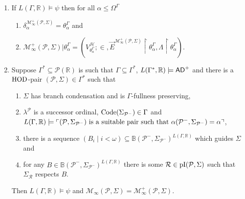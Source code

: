 \documentclass[../main]{subfiles}
\begin{document}
{\begin{enumerate}
  \item If $L(\Gamma, \mathbb{R}) \models \psi$  then for all $\alpha \le \Omega^{\Gamma}$
    \begin{enumerate}
    \item $\delta_{\alpha}^{\mathcal{M}^{+}_{\infty}(\mathcal{P}, \Sigma)}
      = \theta^{\Gamma}_{\alpha}$ and
    \item
      $\mathcal{M}^{+}_{\infty}(\mathcal{P}, \Sigma) |
      \theta^{\Gamma}_{\alpha} =
      (V^{\mathcal{H}}_{\theta^{\Gamma}_{\alpha}};\in,
      \vec{E}^{\mathcal{M}^{+}_{\infty}(\mathcal{P}, \Sigma)}
      \restriction \theta^{\Gamma}_{\alpha}, \Lambda \restriction
      \theta^{\Gamma}_{\alpha})$.
    \end{enumerate}
  \item Suppose $\Gamma^{*} \subseteq \mathcal{P}(\mathbb{R})$ is such
    that $\Gamma \subseteq \Gamma^{*}$,
    $L(\Gamma^{*}, \mathbb{R}) \models \textsf{AD}^{+}$ and there is a
    $\operatorname{HOD}$-pair $(\mathcal{P}, \Sigma) \in \Gamma^{*}$ such that
    \begin{enumerate}
    \item $\Sigma$ has branch condensation and is $\Gamma$-fullness preserving,
    \item $\lambda^{\mathcal{P}}$ is a successor ordinal,
      $\operatorname{Code}(\Sigma_{\mathcal{P}^{-}}) \in \Gamma$ and
      $L(\Gamma, \mathbb{R}) \models \ulcorner  (\mathcal{P},
        \Sigma_{\mathcal{P}^{-}}) \text{ is a suitable pair such that
        } \alpha(\mathcal{P}^{-}, \Sigma_{\mathcal{P}^{-}}) =
        \alpha \urcorner$, 
    \item there is a sequence
      $(B_{i} \mid i < \omega) \subseteq \mathbb{B}(\mathcal{P}^{-},
      \Sigma_{\mathcal{P}^{-}})^{L(\Gamma, \mathbb{R})}$ which guides
      $\Sigma$ and 
    \item for any
      $B \in \mathbb{B}(\mathcal{P}^{-},
      \Sigma_{\mathcal{P}^{-}})^{L(\Gamma, \mathbb{R})}$ there is some
      $\mathcal{R} \in \operatorname{pI}(\mathcal{P}, \Sigma)$ such that
      $\Sigma_{\mathcal{R}}$ respects $B$. 
    \end{enumerate}
    Then $L(\Gamma, \mathbb{R}) \models \psi$ and
    $\mathcal{M}_{\infty}(\mathcal{P}, \Sigma) =
    \mathcal{M}^{+}_{\infty}(\mathcal{P}, \Sigma)$.
  \end{enumerate}
}

\end{document}

